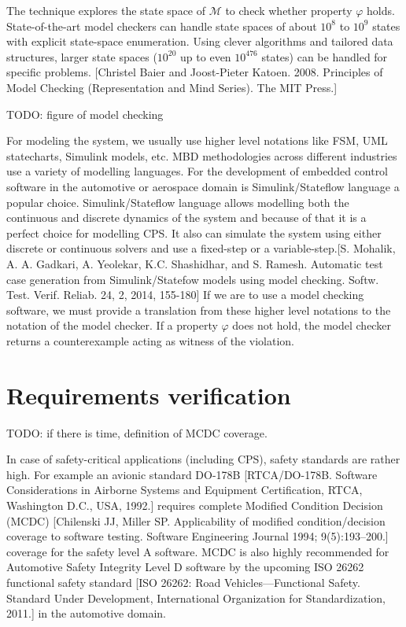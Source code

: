 The technique explores the state space of $\mathcal{M}$ to check whether property $\varphi$ holds. State-of-the-art model checkers can handle state spaces of about $10^8$ to $10^9$ states with explicit state-space enumeration. Using clever algorithms and tailored data structures, larger state spaces ($10^20$ up to even $10^476$ states) can be handled for specific problems. [Christel Baier and Joost-Pieter Katoen. 2008. Principles of Model Checking (Representation and Mind Series). The MIT Press.]

TODO: figure of model checking

For modeling the system, we usually use higher level notations like FSM, UML statecharts, Simulink models, etc. MBD methodologies across different industries use a variety of modelling languages. For the development of embedded control software in the automotive or aerospace domain is Simulink/Stateflow language a popular choice. Simulink/Stateflow language allows modelling both the continuous and discrete dynamics of the system and because of that it is a perfect choice for modelling CPS. It also can simulate the system using either discrete or continuous solvers and use a fixed-step or a variable-step.[S. Mohalik, A. A. Gadkari, A. Yeolekar, K.C. Shashidhar, and S. Ramesh. Automatic test case generation from Simulink/Statefow models using model checking. Softw. Test. Verif. Reliab. 24, 2, 2014, 155-180] If we are to use a model checking software, we must provide a translation from these higher level notations to the notation of the model checker. If a property $\varphi$ does not hold, the model checker returns a counterexample acting as witness of the violation.

\section{Requirements verification}
TODO: if there is time, definition of MCDC coverage.

In case of safety-critical applications (including CPS), safety standards are rather high. For example an avionic standard DO-178B [RTCA/DO-178B. Software Considerations in Airborne Systems and Equipment Certification, RTCA, Washington D.C., USA, 1992.] requires complete Modified Condition Decision (MCDC) [Chilenski JJ, Miller SP. Applicability of modified condition/decision coverage to software testing. Software Engineering Journal 1994; 9(5):193–200.] coverage for the safety level A software. MCDC is also highly recommended for Automotive Safety Integrity Level D software by the upcoming ISO 26262 functional safety standard [ISO 26262: Road Vehicles—Functional Safety. Standard Under Development, International Organization for Standardization, 2011.] in the automotive domain.

